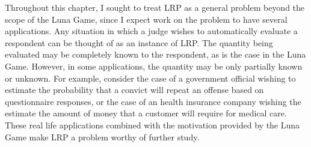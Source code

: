 Throughout this chapter, I sought to treat LRP as a general problem beyond the scope of the Luna Game, since I expect work on the problem to have several applications. Any situation in which a judge wishes to automatically evaluate a respondent can be thought of as an instance of LRP. The quantity being evaluated may be completely known to the respondent, as is the case in the Luna Game. However, in some applications, the quantity may be only partially known or unknown. For example, consider the case of a government official wishing to estimate the probability that a convict will repeat an offense based on questionnaire responses, or the case of an health insurance company wishing the estimate the amount of money that a customer will require for medical care. These real life applications combined with the motivation provided by the Luna Game make LRP a problem worthy of further study.
%
%
%
%
%
%
%
%
%
%
%
